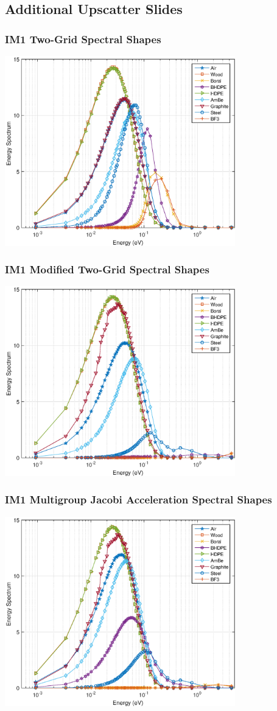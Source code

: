 \documentclass[compress,10pt]{beamer}
\begin{document}
\subsection{Additional Upscatter Slides}
\begin{frame}[t]
{
\frametitle{\small IM1 Two-Grid Spectral Shapes}
\hspace*{1.1cm}
\includegraphics[width=0.75\textwidth]{images/IM1_EC_TG.eps}
}
{
\frametitle{\small IM1 Modified Two-Grid Spectral Shapes}
\hspace*{1.1cm}
\includegraphics[width=0.75\textwidth]{images/IM1_EC_MTG.eps}
}
{
\frametitle{\small IM1 Multigroup Jacobi Acceleration Spectral Shapes}
\hspace*{1.1cm}
\includegraphics[width=0.75\textwidth]{images/IM1_EC_Rich.eps}
}
\end{frame}
\end{document}
